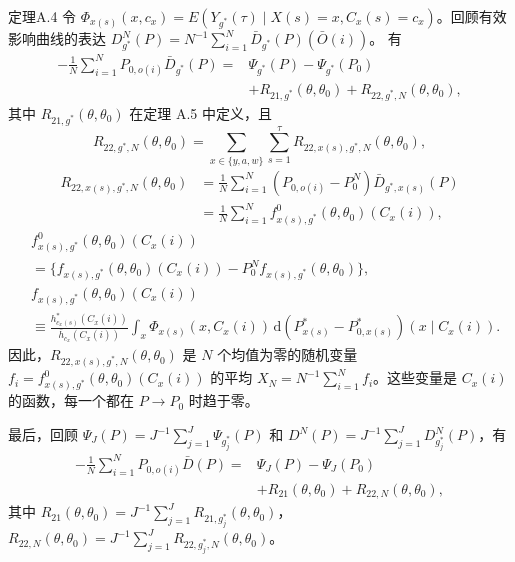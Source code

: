 \begin{bookresult}{定理}{A.4}
令 $\Phi_{x(s)}(x,c_x)=E(Y_{g^*}(\tau)\mid X(s)=x,C_x(s)=c_x)$。回顾有效影响曲线的表达
$D^N_{g^*}(P)=N^{-1}\sum_{i=1}^N\bar D_{g^*}(P)(\bar O(i))$。
有
\[
\begin{aligned}
-\frac1N\sum_{i=1}^NP_{0,o(i)}\bar D_{g^*}(P)
={}&\Psi_{g^*}(P)-\Psi_{g^*}(P_0)\\
&+R_{21,g^*}(\theta,\theta_0)+R_{22,g^*,N}(\theta,\theta_0),
\end{aligned}
\]
其中 $R_{21,g^*}(\theta,\theta_0)$ 在定理 A.5 中定义，且
\[
R_{22,g^*,N}(\theta,\theta_0)
 =\sum_{x\in\{y,a,w\}}\sum_{s=1}^{\tau}R_{22,x(s),g^*,N}(\theta,\theta_0),
\]
\[
\begin{aligned}
R_{22,x(s),g^*,N}(\theta,\theta_0)
&=\frac1N\sum_{i=1}^N(P_{0,o(i)}-P_0^N)\bar D_{g^*,x(s)}(P)\\
&=\frac1N\sum_{i=1}^Nf^0_{x(s),g^*}(\theta,\theta_0)(C_x(i)),
\end{aligned}
\]
\[
\begin{aligned}
&f^0_{x(s),g^*}(\theta,\theta_0)(C_x(i))\\
&=\{f_{x(s),g^*}(\theta,\theta_0)(C_x(i))-P_0^Nf_{x(s),g^*}(\theta,\theta_0)\},\\
&f_{x(s),g^*}(\theta,\theta_0)(C_x(i))\\
&\equiv\frac{h^*_{c_x(s)}(C_x(i))}{\bar h_{c_x}(C_x(i))}
 \int_x\Phi_{x(s)}(x,C_x(i))
 \,\mathrm d(P^*_{x(s)}-P^*_{0,x(s)})(x\mid C_x(i)).
\end{aligned}
\]
因此，$R_{22,x(s),g^*,N}(\theta,\theta_0)$ 是 $N$ 个均值为零的随机变量
$f_i=f^0_{x(s),g^*}(\theta,\theta_0)(C_x(i))$ 的平均
$X_N=N^{-1}\sum_{i=1}^Nf_i$。这些变量是 $C_x(i)$ 的函数，每一个都在 $P\to P_0$ 时趋于零。

最后，回顾 $\Psi_J(P)=J^{-1}\sum_{j=1}^J\Psi_{g_j^*}(P)$ 和
$D^N(P)=J^{-1}\sum_{j=1}^JD^N_{g_j^*}(P)$，有
\[
\begin{aligned}
-\frac1N\sum_{i=1}^NP_{0,o(i)}\bar D(P)
={}&\Psi_J(P)-\Psi_J(P_0)\\
&+R_{21}(\theta,\theta_0)+R_{22,N}(\theta,\theta_0),
\end{aligned}
\]
其中
$R_{21}(\theta,\theta_0)=J^{-1}\sum_{j=1}^JR_{21,g_j^*}(\theta,\theta_0)$，
$R_{22,N}(\theta,\theta_0)=J^{-1}\sum_{j=1}^JR_{22,g_j^*,N}(\theta,\theta_0)$。
\end{bookresult}
